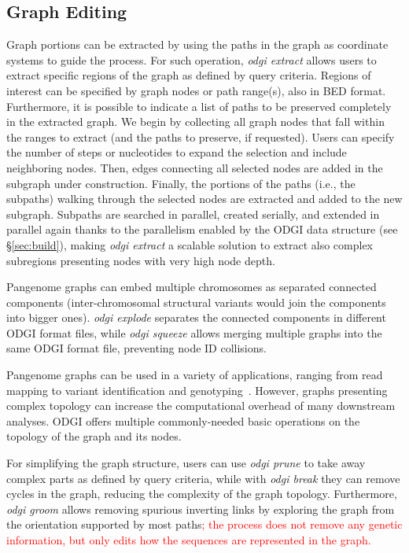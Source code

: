 \documentclass{bioinfo}
\newcommand{\REVIEWED}[1]{{\textcolor{Red}{#1}}}
\begin{document}
\subsection{Graph Editing}
\label{sec:supp_edit}
Graph portions can be extracted by using the paths in the graph as coordinate systems to guide the process. For such operation, \textit{odgi extract} allows users to extract specific regions of the graph as defined by query criteria.
Regions of interest can be specified by graph nodes or path range(s), also in BED format. Furthermore, it is possible to indicate a list of paths to be preserved completely in the extracted graph.
We begin by collecting all graph nodes that fall within the ranges to extract (and the paths to preserve, if requested).
Users can specify the number of steps or nucleotides to expand the selection and include neighboring nodes.
Then, edges connecting all selected nodes are added in the subgraph under construction.
Finally, the portions of the paths (i.e., the subpaths) walking through the selected nodes are extracted and added to the new subgraph.
Subpaths are searched in parallel, created serially, and extended in parallel again thanks to the parallelism enabled by the ODGI data structure (see \S\ref{sec:build}), making \textit{odgi extract} a scalable solution to extract also complex subregions presenting nodes with very high node depth.

Pangenome graphs can embed multiple chromosomes as separated connected components (inter-chromosomal structural variants would join the components into bigger ones).
\textit{odgi explode} separates the connected components in different ODGI format files, while \textit{odgi squeeze} allows merging multiple graphs into the same ODGI format file, preventing node ID collisions.

Pangenome graphs can be used in a variety of applications, ranging from read mapping to variant identification and genotyping~\citep{Eizenga_2020}.
However, graphs presenting complex topology can increase the computational overhead of many downstream analyses.
ODGI offers multiple commonly-needed basic operations on the topology of the graph and its nodes.

For simplifying the graph structure, users can use \textit{odgi prune} to take away complex parts as defined by query criteria,
while with \textit{odgi break} they can remove cycles in the graph, reducing the complexity of the graph topology.
Furthermore, \textit{odgi groom} allows removing spurious inverting links by exploring the graph from the orientation supported by most paths\REVIEWED{;
	the process does not remove any genetic information, but only edits how the sequences are represented in the graph.}
\end{document}
